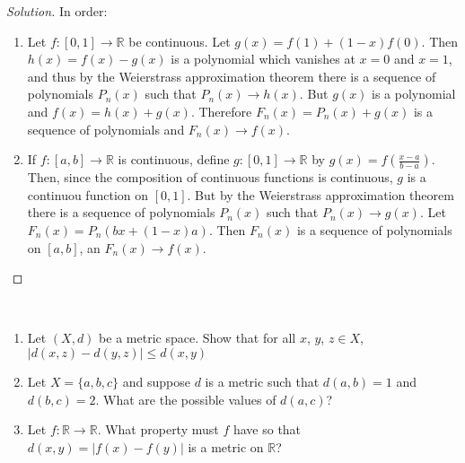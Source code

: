 \documentclass[crop=false,class=article,oneside]{standalone}
\begin{document}
        \begin{proof}[Solution]
            In order:
            \begin{enumerate}
                \item Let $f:[0,1]\rightarrow\mathbb{R}$ be
                      continuous. Let
                      $g(x)=f(1)+(1-x)f(0)$. Then
                      $h(x)=f(x)-g(x)$ is a polynomial which
                      vanishes at $x=0$ and $x=1$, and thus
                      by the Weierstrass approximation theorem
                      there is a sequence of polynomials
                      $P_{n}(x)$ such that
                      $P_{n}(x)\rightarrow{h(x)}$.
                      But $g(x)$ is a polynomial and
                      $f(x)=h(x)+g(x)$. Therefore
                      $F_{n}(x)=P_{n}(x)+g(x)$ is a sequence
                      of polynomials and
                      $F_{n}(x)\rightarrow{f(x)}$.
                \item If $f:[a,b]\rightarrow\mathbb{R}$ is
                      continuous, define
                      $g:[0,1]\rightarrow\mathbb{R}$ by
                      $g(x)=f(\frac{x-a}{b-a})$. Then, since
                      the composition of continuous functions
                      is continuous, $g$ is a continuou function
                      on $[0,1]$. But by the Weierstrass
                      approximation theorem there is a sequence
                      of polynomials $P_{n}(x)$ such that
                      $P_{n}(x)\rightarrow{g(x)}$. Let
                      $F_{n}(x)=P_{n}(bx+(1-x)a)$. Then
                      $F_{n}(x)$ is a sequence of polynomials
                      on $[a,b]$, an    $F_{n}(x)\rightarrow{f(x)}$.
            \end{enumerate}
        \end{proof}
        \begin{problem}
            \
            \begin{enumerate}
                \item Let $(X,d)$ be a metric space. Show that
                      for all $x$, $y$, $z\in{X}$,
                      $|d(x,z)-d(y,z)|\leq{d(x,y)}$
                \item Let $X=\{a,b,c\}$ and suppose $d$ is
                      a metric such that $d(a,b)=1$ and
                      $d(b,c)=2$. What are the possible values
                      of $d(a,c)$?
                \item Let $f:\mathbb{R}\rightarrow\mathbb{R}$.
                      What property must $f$ have so that
                      $d(x,y)=|f(x)-f(y)|$ is a metric on
                      $\mathbb{R}$?
            \end{enumerate}
        \end{problem}
\end{document}
